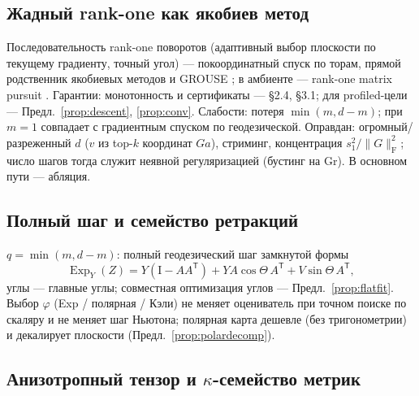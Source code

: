 \documentclass[11pt,a4paper]{article}
\newcommand{\Id}{\mathrm I}
\newcommand{\T}{^{\mathsf T}}
\newcommand{\F}{_{\mathrm F}}
\newcommand{\Gr}{\mathrm{Gr}}
\newcommand{\Exp}{\operatorname{Exp}}
\theoremstyle{remark}
\begin{document}
\subsection{Жадный rank-one как якобиев метод}\label{sec:rankone}

Последовательность rank-one поворотов (адаптивный выбор плоскости по
текущему градиенту, точный угол) --- покоординатный спуск по торам,
прямой родственник якобиевых методов \cite{jacobi,schonhage} и GROUSE
\cite{grouse}; в амбиенте --- rank-one matrix pursuit \cite{pursuit,mallat}.
Гарантии: монотонность и сертификаты --- §2.4, §3.1; для profiled-цели ---
Предл.~\ref{prop:descent}, \ref{prop:conv}. Слабости: потеря
 $\min(m,d-m)$; при $m=1$ совпадает с градиентным спуском по геодезической.
Оправдан: огромный/разреженный $d$ ($v$ из top-$k$ координат $Ga$),
стриминг, концентрация $s_1^2/\|G\|\F^2$; число шагов тогда служит
неявной регуляризацией (бустинг на $\Gr$). В основном пути ---
абляция.

\subsection{Полный шаг и семейство ретракций}\label{sec:fullstep}

 $q=\min(m,d-m)$: полный геодезический шаг замкнутой формы
\begin{equation}\label{eq:rotone}
 \Exp_Y(Z)=Y(\Id-AA\T)+YA\cos\Theta\,A\T+V\sin\Theta\,A\T,
\end{equation}
углы --- главные углы; совместная оптимизация углов --- Предл.~\ref{prop:flatfit}.
Выбор $\varphi$ (Exp / полярная / Кэли) не меняет оцениватель при точном
поиске по скаляру и не меняет шаг Ньютона; полярная карта дешевле
(без тригонометрии) и декалирует плоскости (Предл.~\ref{prop:polardecomp}).

\subsection{Анизотропный тензор и $\kappa$-семейство метрик}\label{sec:tensor}
\end{document}
